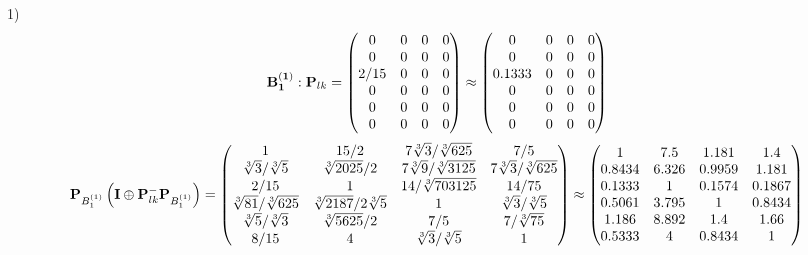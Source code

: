 \documentclass[10pt,a4paper]{article}
\begin{document}
	1)
	\[
		\bold{B_1^{(1)}}: \bold{P}_{lk} = 
		\begin{pmatrix}
			{{0}}{} & {{0}}{} & {{0}}{} & {{0}}{} \\
			{{0}}{} & {{0}}{} & {{0}}{} & {{0}}{} \\
			{{2}} / {{15}} & {{0}}{} & {{0}}{} & {{0}}{} \\
			{{0}}{} & {{0}}{} & {{0}}{} & {{0}}{} \\
			{{0}}{} & {{0}}{} & {{0}}{} & {{0}}{} \\
			{{0}}{} & {{0}}{} & {{0}}{} & {{0}}{} \\
		\end{pmatrix}
		\approx
		\begin{pmatrix}
			0        & 0        & 0        & 0        \\
			0        & 0        & 0        & 0        \\
			0.1333   & 0        & 0        & 0        \\
			0        & 0        & 0        & 0        \\
			0        & 0        & 0        & 0        \\
			0        & 0        & 0        & 0        \\
		\end{pmatrix}
	\]
	\[
		\bold{P}_{B_1^{(1)}}\left(\bold{I} \oplus \bold{P}_{lk}^{-}\bold{P}_{B_1^{(1)}}\right) = 
		\begin{pmatrix}
			{1}{} & {{15}} / {{2}} & {{7}\sqrt[3]{3}} / {\sqrt[3]{625}} & {{7}} / {{5}} \\
			{\sqrt[3]{3}} / {\sqrt[3]{5}} & {\sqrt[3]{2025}} / {{2}} & {{7}\sqrt[3]{9}} / {\sqrt[3]{3125}} & {{7}\sqrt[3]{3}} / {\sqrt[3]{625}} \\
			{{2}} / {{15}} & {1}{} & {{14}} / {\sqrt[3]{703125}} & {{14}} / {{75}} \\
			{\sqrt[3]{81}} / {\sqrt[3]{625}} & {\sqrt[3]{2187}} / {{2}\sqrt[3]{5}} & {1}{} & {\sqrt[3]{3}} / {\sqrt[3]{5}} \\
			{\sqrt[3]{5}} / {\sqrt[3]{3}} & {\sqrt[3]{5625}} / {{2}} & {{7}} / {{5}} & {{7}} / {\sqrt[3]{75}} \\
			{{8}} / {{15}} & {{4}}{} & {\sqrt[3]{3}} / {\sqrt[3]{5}} & {1}{} \\
		\end{pmatrix}
		\approx
		\begin{pmatrix}
			1        & 7.5      & 1.181    & 1.4      \\
			0.8434   & 6.326    & 0.9959   & 1.181    \\
			0.1333   & 1        & 0.1574   & 0.1867   \\
			0.5061   & 3.795    & 1        & 0.8434   \\
			1.186    & 8.892    & 1.4      & 1.66     \\
			0.5333   & 4        & 0.8434   & 1        \\
		\end{pmatrix}
	\]
\end{document}
